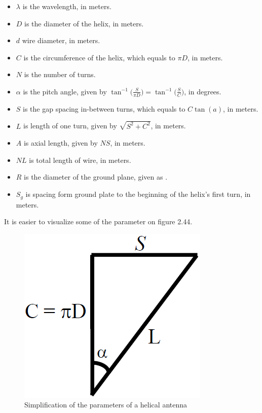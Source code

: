 \begin{itemize}
  \item $\lambda$ is the wavelength, in meters.    
  \item $D$ is the diameter of the helix, in meters.
  \item $d$ wire diameter, in meters.
  \item $C$ is the circumference of the helix, which equals to $\pi D$, in meters.
  \item $N$ is the number of turns.
  \item $\alpha$ is the pitch angle, given by $\tan^{-1}\Big(\frac{S}{\pi D}\Big)=\tan^{-1}\Big(\frac{S}{C}\Big)$, in degrees.
  \item $S$ is the gap spacing in-between turns, which equals to $C \tan(a)$, in meters.
  \item $L$ is length of one turn, given by $\sqrt{S^2+C^2}$, in meters.
  \item $A$ is axial length, given by $NS$, in meters.
  \item $NL$ is total length of wire, in meters.
  \item $R$ is the diameter of the ground plane, given as .
  \item $S_g$ is spacing form ground plate to the beginning of the helix's first turn, in meters.
\end{itemize}

It is easier to visualize some of the parameter on figure 2.44.

\begin{figure}[h]
\centering
\includegraphics[scale=0.5]{figures/TriangleMath.PNG}
\caption{Simplification of the parameters of a helical antenna}
\end{figure}

